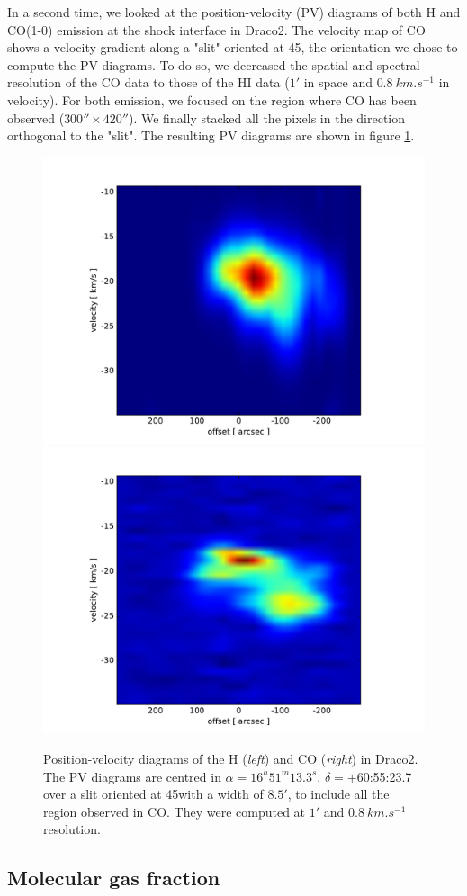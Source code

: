 \documentclass[traditabstract]{aa}
\begin{document}
   In a second time, we looked at the position-velocity (PV) diagrams of both H and CO(1-0) emission at the shock interface in Draco2. The velocity map of CO shows a velocity gradient along a "slit" oriented at 45\degree, the orientation we chose to compute the PV diagrams. To do so, we decreased the spatial and spectral resolution of the CO data to those of the HI data ($1'$ in space and $0.8\: km.s^{-1}$ in velocity). For both emission, we focused on the region where CO has been observed ($300''\times 420''$). We finally stacked all the pixels in the direction orthogonal to the "slit". The resulting PV diagrams are shown in figure \ref{PV-diag}.

\begin{figure}[h!]
  \centering
  \includegraphics[width=0.48\linewidth,trim=70 10 95 40,clip=true]{Figures/PV_diagram_HI.pdf}
  \hspace{3mm}
  \includegraphics[width=0.48\linewidth,trim=70 10 95 40,clip=true]{Figures/PV_diagram_CO.pdf}
  \caption{\label{PV-diag} Position-velocity diagrams of the H (\emph{left}) and CO (\emph{right}) in Draco2. The PV diagrams are centred in $\alpha=16^h 51^m 13.3^s$, $\delta=+$60:55:23.7 over a slit oriented at 45\degree with a width of $8.5'$, to include all the region observed in CO. They were computed at $1'$ and $0.8\: km.s^{-1}$ resolution.}
\end{figure}


   \subsection{Molecular gas fraction}
\end{document}
